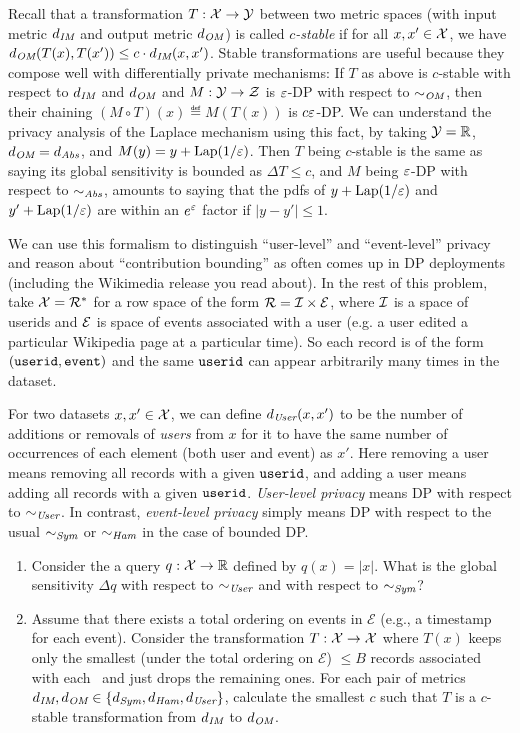 \documentclass[11pt]{article}
\begin{document}
\begin{enumerate}[leftmargin=*]
Recall that a transformation $T : \mathcal{X} \rightarrow \mathcal{Y}$ between two metric spaces (with input metric $d_{\textit{IM}}$ and output metric $d_{\textit{OM}}$) is called {\em $c$-stable} if for all $x,x'\in \mathcal{X}$, we have $d_{\textit{OM}}(T(x),T(x'))\leq c\cdot d_{\textit{IM}}(x,x')$.  
Stable transformations are useful because they compose well with differentially private mechanisms: If $T$ as above is $c$-stable with respect to $d_{\textit{IM}}$ and $d_{\textit{OM}}$ and $M : \mathcal{Y}\rightarrow \mathcal{Z}$ is $\varepsilon$-DP with respect to $\sim_{\textit{OM}}$, then their chaining $(M\circ T)(x) \eqdef M(T(x))$ is $c\varepsilon$-DP.  We can understand the privacy analysis of the Laplace mechanism using this fact, by taking $\mathcal{Y}=\mathbb{R}$, $d_{\textit{OM}}=d_{\textit{Abs}}$, and $M(y)=y+\mathrm{Lap}(1/\varepsilon)$.  Then $T$ being $c$-stable is the same as saying its global sensitivity is bounded as $\Delta T\leq c$, and $M$ being $\varepsilon$-DP with respect to $\sim_{\textit{Abs}}$, amounts to saying that the pdfs of $y+\mathrm{Lap}(1/\varepsilon)$ and $y'+\mathrm{Lap}(1/\varepsilon)$ are within an $e^\varepsilon$ factor if $|y-y'|\leq 1$.

We can use this formalism to distinguish ``user-level'' and ``event-level'' privacy and reason about ``contribution bounding'' as often comes up in DP deployments (including the Wikimedia release you read about).
In the rest of this problem, take $\mathcal{X}=\mathcal{R}^*$ for a row space of the form $\mathcal{R}=\mathcal{I}\times \mathcal{E}$, where $\mathcal{I}$ is a space of userids and $\mathcal{E}$ is space of events associated with a user (e.g. a user edited a particular Wikipedia page at a particular time). So each record is of the form $(\texttt{userid},\texttt{event})$ and the same $\texttt{userid}$ can appear arbitrarily many times in the dataset. 

For two datasets $x,x'\in \mathcal{X}$, we can define $d_{\textit{User}}(x,x')$ to be the number of additions or removals of {\em users} from $x$ for it to have the same number of occurrences of each element (both user and event) as $x'$. Here removing a user means removing all records with a given $\texttt{userid}$, and adding a user means adding all records with a given $\texttt{userid}$.  {\em User-level privacy} means DP with respect to $\sim_{\textit{User}}$. In contrast, {\em event-level privacy} simply means DP with respect to the usual $\sim_{\textit{Sym}}$ or $\sim_{\textit{Ham}}$ in the case of bounded DP.

\begin{enumerate}
\item \label{part:sensitivity} Consider the a query 
$q : \mathcal{X}\rightarrow \mathbb{R}$ defined by 
$q(x) = |x|$.  What is the global sensitivity $\Delta q$ with respect to $\sim_{\textit{User}}$ and with respect to $\sim_{\textit{Sym}}$?

\item \label{part:stability} Assume that there exists a total ordering on events in $\mathcal{E}$ (e.g., a timestamp for each event). Consider the transformation $T : \mathcal{X}\rightarrow \mathcal{X}$ where $T(x)$ keeps only the smallest (under the total ordering on $\mathcal{E}$) $\leq B$ records associated with each \userid\ and just drops the remaining ones.  For each pair of metrics $d_{\textit{IM}},d_{\textit{OM}} \in \{d_{\textit{Sym}},d_{\textit{Ham}},d_{\textit{User}}\}$, calculate the smallest $c$ such that $T$ is a $c$-stable transformation from $d_{\textit{IM}}$ to $d_{\textit{OM}}$.  


\end{enumerate}
\end{enumerate}
\end{document}
